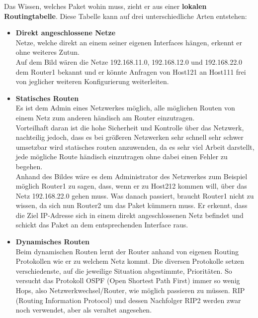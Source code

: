 \documentclass[12pt,a4paper]{report}
\begin{document}
Das Wissen, welches Paket wohin muss, zieht er aus einer \textbf{lokalen Routingtabelle}. Diese Tabelle kann auf drei unterschiedliche Arten entstehen:\\
\begin{itemize}
\item \textbf{Direkt angeschlossene Netze}\\
Netze, welche direkt an einem seiner eigenen Interfaces hängen, erkennt er ohne weiteres Zutun.\\
Auf dem Bild wären die Netze 192.168.11.0, 192.168.12.0 und 192.168.22.0 dem Router1 bekannt und er könnte Anfragen von Host121 an Host111 frei von jeglicher weiteren Konfigurierung weiterleiten.
\item \textbf{Statisches Routen}\\
Es ist dem Admin eines Netzwerkes möglich, alle möglichen Routen von einem Netz zum anderen händisch am Router einzutragen.\\
Vorteilhaft daran ist die hohe Sicherheit und Kontrolle über das Netzwerk, nachteilig jedoch, dass es bei größeren Netzwerken sehr schnell sehr schwer umsetzbar wird statisches routen anzuwenden, da es sehr viel Arbeit darstellt, jede mögliche Route händisch einzutragen ohne dabei einen Fehler zu begehen.\\
Anhand des Bildes wäre es dem Administrator des Netzwerkes zum Beispiel möglich Router1 zu sagen, dass, wenn er zu Host212 kommen will, über das Netz 192.168.22.0 gehen muss. Was danach passiert, braucht Router1 nicht zu wissen, da sich nun Router2 um das Paket kümmern muss. Er erkennt, dass die Ziel IP-Adresse sich in einem direkt angeschlossenen Netz befindet und schickt das Paket an dem entsprechenden Interface raus.
\item \textbf{Dynamisches Routen}\\
Beim dynamischen Routen lernt der Router anhand von eigenen Routing Protokollen wie er zu welchem Netz kommt. Die diversen Protokolle setzen verschiedenste, auf die jeweilige Situation abgestimmte, Prioritäten. So versucht das Protokoll OSPF (Open Shortest Path First) immer so wenig Hops, also Netzwerkwechsel/Router, wie möglich passieren zu müssen. RIP (Routing Information Protocol) und dessen Nachfolger RIP2 werden zwar noch verwendet, aber als veraltet angesehen.
\end{itemize}
\end{document}
